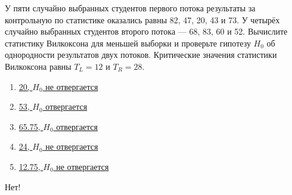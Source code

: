 \documentclass[t]{beamer}
\begin{document}
 \begin{frame} \label{30-No} 
\begin{block}{30} 

У пяти случайно выбранных студентов первого потока результаты за контрольную по статистике оказались равны  82, 47, 20, 43 и 73. У четырёх случайно выбранных студентов второго потока — 68, 83, 60 и 52. Вычислите статистику Вилкоксона для меньшей выборки и проверьте гипотезу $H_0$ об однородности результатов  двух потоков. Критические значения статистики Вилкоксона равны $T_L=12$ и $T_R=28$.
 


 \end{block} 
\begin{enumerate} 
\item[] \hyperlink{30-No}{\beamergotobutton{} 20, $H_0$ не отвергается}
\item[] \hyperlink{30-No}{\beamergotobutton{} 53, $H_0$ отвергается}
\item[] \hyperlink{30-No}{\beamergotobutton{} 65.75, $H_0$ отвергается}
\item[] \hyperlink{30-Yes}{\beamergotobutton{} 24, $H_0$ не отвергается}
\item[] \hyperlink{30-No}{\beamergotobutton{} 12.75, $H_0$ не отвергается}
\end{enumerate} 

 \alert{Нет!} 
\end{frame} 
\end{document}
